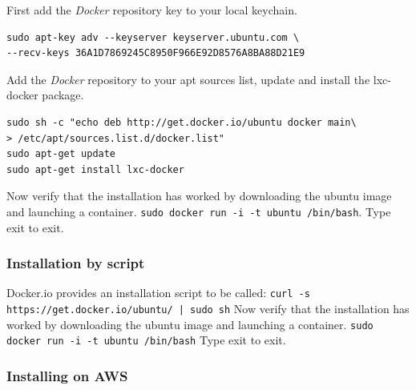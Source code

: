 \documentclass[11pt]{article}
\begin{document}
First add the \emph{Docker} repository key to your local keychain.

\begin{verbatim}
sudo apt-key adv --keyserver keyserver.ubuntu.com \
--recv-keys 36A1D7869245C8950F966E92D8576A8BA88D21E9
\end{verbatim}
Add the \emph{Docker} repository to your apt sources list, update and install
the lxc-docker package.

\begin{verbatim}
sudo sh -c "echo deb http://get.docker.io/ubuntu docker main\
> /etc/apt/sources.list.d/docker.list"
sudo apt-get update
sudo apt-get install lxc-docker
\end{verbatim}
Now verify that the installation has worked by downloading the ubuntu
image and launching a container. \texttt{sudo docker run -i -t ubuntu /bin/bash}.
Type exit to exit.
\subsubsection{Installation by script}
\label{sec-2-2-3}

Docker.io provides an installation script to be called: \texttt{curl -s https://get.docker.io/ubuntu/ | sudo sh}
Now verify that the installation has worked by downloading the ubuntu
image and launching a container. \texttt{sudo docker run -i -t ubuntu /bin/bash}
Type exit to exit.
\subsubsection{Installing on AWS}
\label{sec-2-2-4}
\end{document}
